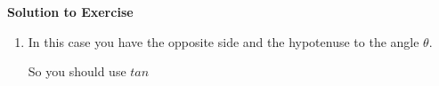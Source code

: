 {\begin{mdframed}[linewidth=4, leftmargin=40, rightmargin=40]
\begin{exercise}
 \par 
      \vspace{5pt}
      \label{m39408*solfhsst!!!underscore!!!id1206}\noindent\textbf{Solution to Exercise } \label{m39408*listfhsst!!!underscore!!!id1206}\begin{enumerate}[noitemsep, label=\textbf{Step} \textbf{\arabic*}. ] 
            \leftskip=20pt\rightskip=\leftskip\item  
      \label{m39408*id81396}In this case you have the opposite side and the hypotenuse to the angle \begin{math}\theta \end{math}.\par 
      \label{m39408*id81410}So you should use \begin{math}tan\end{math}\par 
      \label{m39408*id81425}\nopagebreak\noindent{}
    

\end{enumerate}
\end{exercise}
\end{mdframed}}
